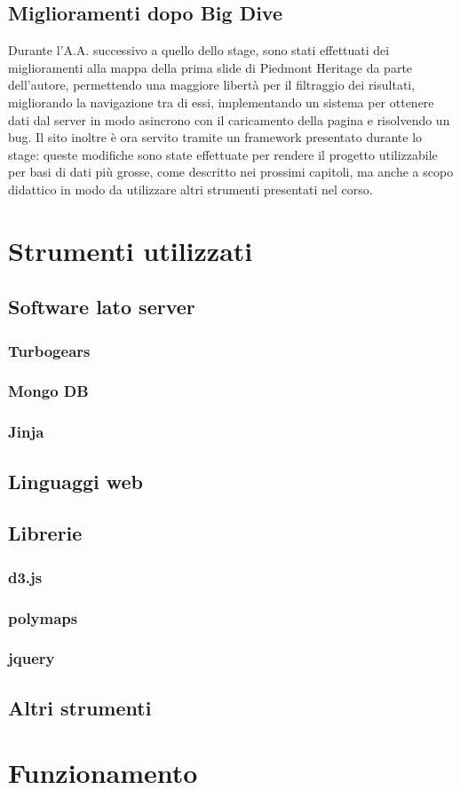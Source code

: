 	\subsection{Miglioramenti dopo Big Dive}
	Durante l'A.A. successivo a quello dello stage, sono stati effettuati dei miglioramenti alla mappa della prima slide di Piedmont Heritage da parte dell'autore, permettendo una maggiore libertà per il filtraggio dei risultati, migliorando la navigazione tra di essi, implementando un sistema per ottenere dati dal server in modo asincrono con il caricamento della pagina e risolvendo un bug.
	Il sito inoltre è ora servito tramite un framework presentato durante lo stage: queste modifiche sono state effettuate per rendere il progetto utilizzabile per basi di dati più grosse, come descritto nei prossimi capitoli, ma anche a scopo didattico in modo da utilizzare altri strumenti presentati nel corso.	
	\section{Strumenti utilizzati}
		\subsection{Software lato server}%
			\subsubsection{Turbogears}
			\subsubsection{Mongo DB}
			\subsubsection{Jinja}%
		\subsection{Linguaggi web}
		\subsection{Librerie}
			\subsubsection{d3.js}
			\subsubsection{polymaps}
			\subsubsection{jquery}
		\subsection{Altri strumenti}
			
	\section{Funzionamento}%